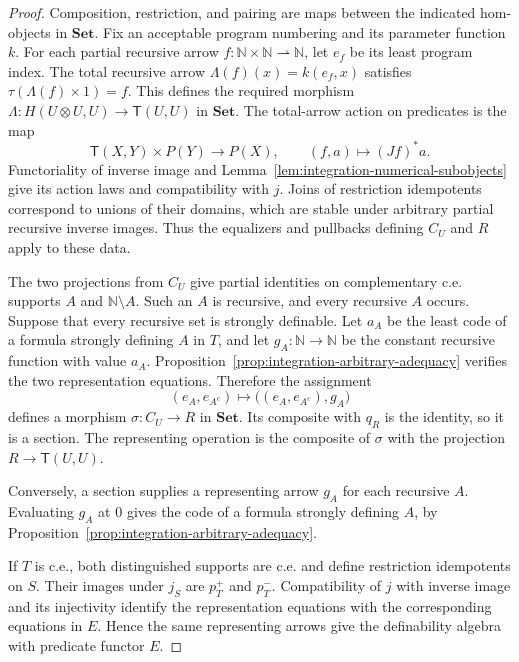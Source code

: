 \documentclass[11pt]{article}
\theoremstyle{definition}
\theoremstyle{remark}
\begin{document}
\begin{proof}
Composition, restriction, and pairing are maps between the
indicated hom-objects in $\mathbf{Set}$.
Fix an acceptable program numbering and its parameter function
$k$. For each partial recursive arrow
$f:\mathbb N\times\mathbb N\rightharpoonup\mathbb N$, let
$e_f$ be its least program index. The total recursive arrow
$\Lambda(f)(x)=k(e_f,x)$ satisfies
$\tau(\Lambda(f)\times1)=f$. This defines the required morphism
$\Lambda:H(U\otimes U,U)\to\mathsf T(U,U)$ in $\mathbf{Set}$.
The total-arrow action on predicates is the map
\[
 \mathsf T(X,Y)\times P(Y)\longrightarrow P(X),
 \qquad (f,a)\longmapsto (Jf)^*a.
\]
Functoriality of inverse image and
Lemma~\ref{lem:integration-numerical-subobjects} give its action
laws and compatibility with $j$. Joins of restriction idempotents
correspond to unions of their domains, which are stable under
arbitrary partial recursive inverse images.
Thus the equalizers and pullbacks defining $C_U$ and $R$ apply
to these data.

The two projections from $C_U$ give partial identities on
complementary c.e. supports $A$ and $\mathbb N\setminus A$.
Such an $A$ is recursive, and every recursive $A$ occurs.
Suppose that every recursive set is strongly definable. Let
$a_A$ be the least code of a formula strongly defining $A$ in
$T$, and let $g_A:\mathbb N\to\mathbb N$ be the constant
recursive function with value $a_A$.
Proposition~\ref{prop:integration-arbitrary-adequacy} verifies
the two representation equations. Therefore the assignment
\[
 (e_A,e_{A^c})\longmapsto
 \bigl((e_A,e_{A^c}),g_A\bigr)
\]
defines a morphism $\sigma:C_U\to R$ in $\mathbf{Set}$.
Its composite with $q_R$ is the identity, so it is a section.
The representing operation is the composite of $\sigma$ with
the projection $R\to \mathsf T(U,U)$.

Conversely, a section supplies a representing arrow $g_A$ for
each recursive $A$. Evaluating $g_A$ at $0$ gives the code of
a formula strongly defining $A$, by
Proposition~\ref{prop:integration-arbitrary-adequacy}.

If $T$ is c.e., both distinguished supports are c.e. and define
restriction idempotents on $S$. Their images under $j_S$ are
$p_T^+$ and $p_T^-$. Compatibility of $j$ with inverse image
and its injectivity identify the representation equations with
the corresponding equations in $E$. Hence the same representing
arrows give the definability algebra with predicate functor $E$.
\end{proof}
\end{document}

